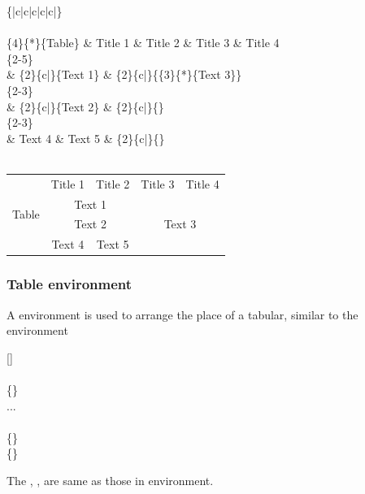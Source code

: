\begin{frame}
	\begin{example}
		\{|c|c|c|c|c|\} \\
		\qquad {} \\
		\qquad {}\{4\}\{*\}\{Table\} \& Title 1 \& Title 2 \& Title 3 \& Title 4 \samplecommand{\textbackslash} \\
		\qquad {}\{2-5\} \\
		\qquad \& \{2\}\{c|\}\{Text 1\} \& \{2\}\{c|\}\{\{3\}\{*\}\{Text 3\}\} \samplecommand{\textbackslash} \\
		\qquad {}\{2-3\} \\
		\qquad \& \{2\}\{c|\}\{Text 2\} \& \{2\}\{c|\}\{\} \samplecommand{\textbackslash} \\
		\qquad {}\{2-3\} \\
		\qquad \& Text 4 \& Text 5 \& \{2\}\{c|\}\{\} \samplecommand{\textbackslash} \\
		\qquad {} \\
	\end{example}
	\begin{tabular}{|c|c|c|c|c|}
		\hline
		\multirow{4}{*}{Table} & Title 1 & Title 2 & Title 3 & Title 4 \\
		\cline{2-5}
		& \multicolumn{2}{c|}{Text 1} & \multicolumn{2}{c|}{\multirow{3}{*}{Text 3}} \\
		\cline{2-3}
		& \multicolumn{2}{c|}{Text 2} & \multicolumn{2}{c|}{} \\
		\cline{2-3}
		& Text 4 & Text 5 & \multicolumn{2}{c|}{} \\
		\hline
	\end{tabular}
\end{frame}

\begin{frame}
	\frametitle{Table environment}
    A  environment is used to arrange the place of a tabular, similar to the  environment
    \begin{command}
    	[]\\
    	\qquad {}\\
    	\qquad {}\{\}\\
    	\qquad \qquad ...\\
    	\qquad {}\\
    	\qquad {}\{\}\\
    	\qquad {}\{\}\\
	\end{command}
	The , ,  are same as those in  environment. 
\end{frame}

